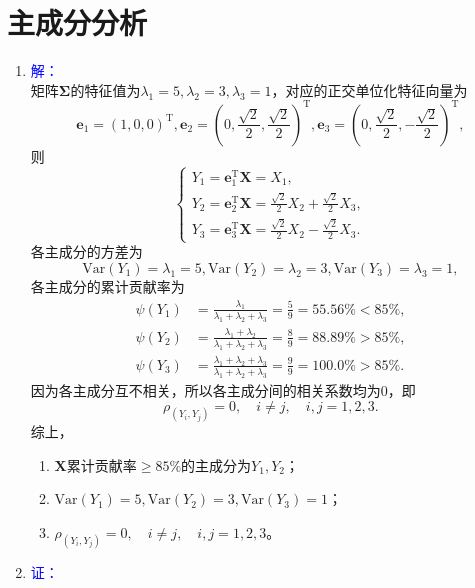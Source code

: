 \section{主成分分析}
    \begin{enumerate}
        \item
        {\kaishu \textcolor{blue}{解：}}\\
        矩阵$\pmb{\Sigma}$的特征值为$\lambda_1=5,\lambda_2=3,\lambda_3=1$，对应的正交单位化特征向量为
        \[\pmb{e}_1=(1,0,0)^{\mathrm{T}},\pmb{e}_2=\left(0,\frac{\sqrt{2}}{2},\frac{\sqrt{2}}{2}\right)^{\mathrm{T}},\pmb{e}_3=\left(0,\frac{\sqrt{2}}{2},-\frac{\sqrt{2}}{2}\right)^{\mathrm{T}},\]
        则
        \[\begin{cases}
            Y_1=\pmb{e}_1^{\mathrm{T}}\pmb{X}=X_1,\\
            \displaystyle Y_2=\pmb{e}_2^{\mathrm{T}}\pmb{X}=\frac{\sqrt{2}}{2}X_2+\frac{\sqrt{2}}{2}X_3,\\
            \displaystyle Y_3=\pmb{e}_3^{\mathrm{T}}\pmb{X}=\frac{\sqrt{2}}{2}X_2-\frac{\sqrt{2}}{2}X_3.
            \end{cases}\]
        各主成分的方差为\[\mathrm{Var}(Y_1)=\lambda_1=5,\mathrm{Var}(Y_2)=\lambda_2=3,\mathrm{Var}(Y_3)=\lambda_3=1,\]
        各主成分的累计贡献率为
        \begin{align*}
            \psi(Y_1) & =\frac{\lambda_1}{\lambda_1+\lambda_2+\lambda_3}=\frac{5}{9}=55.56\%<85\%,\\
            \psi(Y_2) & =\frac{\lambda_1+\lambda_2}{\lambda_1+\lambda_2+\lambda_3}=\frac{8}{9}=88.89\%>85\%,\\
            \psi(Y_3) & =\frac{\lambda_1+\lambda_2+\lambda_3}{\lambda_1+\lambda_2+\lambda_3}=\frac{9}{9}=100.0\%>85\%.
        \end{align*}
        因为各主成分互不相关，所以各主成分间的相关系数均为0，即
        \[\rho_{(Y_i,Y_j)}=0,\quad i \neq j, \quad i,j=1,2,3.\]
        综上，
        \begin{enumerate}[label=(\arabic*)]
            \item $\pmb{X}$累计贡献率$\geq 85\%$的主成分为$Y_1,Y_2$；
            \item $\mathrm{Var}(Y_1)=5,\mathrm{Var}(Y_2)=3,\mathrm{Var}(Y_3)=1$；
            \item $\rho_{(Y_i,Y_j)}=0,\quad i \neq j, \quad i,j=1,2,3$。
        \end{enumerate}
        \item
        {\kaishu\textcolor{blue}{证：}}\\

\end{enumerate}
